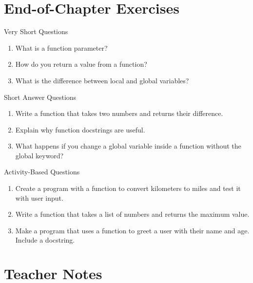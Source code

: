\section{End-of-Chapter Exercises}

\begin{exercise}{Very Short Questions}
\begin{enumerate}
    \item What is a function parameter?  
    \item How do you return a value from a function?  
    \item What is the difference between local and global variables?  
\end{enumerate}
\end{exercise}

\begin{exercise}{Short Answer Questions}
\begin{enumerate}
    \item Write a function that takes two numbers and returns their difference.  
    \item Explain why function docstrings are useful.  
    \item What happens if you change a global variable inside a function without the global keyword?  
\end{enumerate}
\end{exercise}

\begin{exercise}{Activity-Based Questions}
\begin{enumerate}
    \item Create a program with a function to convert kilometers to miles and test it with user input.  
    \item Write a function that takes a list of numbers and returns the maximum value.  
    \item Make a program that uses a function to greet a user with their name and age. Include a docstring.  
\end{enumerate}
\end{exercise}

\section{Teacher Notes}

